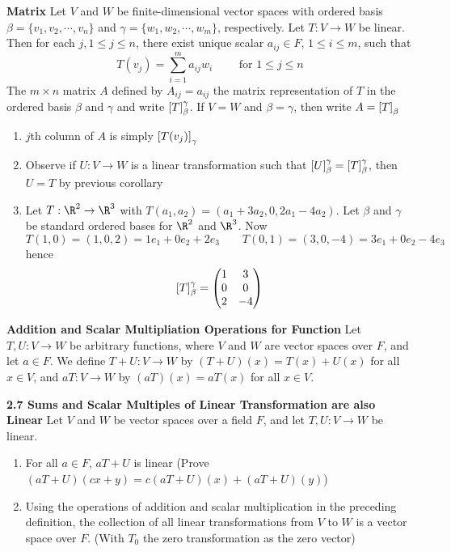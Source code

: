 \documentclass[11pt]{article}
\begin{document}
\begin{defn*}
    \textbf{Matrix} Let $V$ and $W$ be finite-dimensional vector spaces with ordered basis $\beta = \{v_1,v_2,\cdots, v_n\}$ and $\gamma = \{w_1,w_2,\cdots, w_m\}$, respectively. Let $T:V\to W$ be linear. Then for each $j, 1\leq j \leq n$, there exist unique scalar $a_{ij} \in F$, $1\leq i \leq m$, such that 
    \[
        T(v_j) = \sum_{i=1}^m a_{ij}w_i 
        \quad \quad 
        \text{ for } 1\leq j \leq n    
    \]
    The $m\times n$ matrix $A$ defined by $A_{ij}=a_{ij}$ the matrix representation of $T$ in the ordered basis $\beta$ and $\gamma$ and write $\left[ T \right]_{\beta}^{\gamma}$. If $V=W$ and $\beta=\gamma$, then write $A = \left[ T \right]_{\beta}$
    \begin{enumerate}
        \item $j$th column of $A$ is simply $\left[ T(v_j) \right]_{\gamma}$
        \item Observe if $U:V\to W$ is a linear transformation such that $\left[ U \right]_{\beta}^{\gamma}=  \left[ T \right]_{\beta}^{\gamma}$, then $U=T$ by previous corollary 
        \item Let $T:\R^2\to \R^3$ with $T(a_1,a_2) = (a_1+3a_2, 0, 2a_1-4a_2)$. Let $\beta$ and $\gamma$ be standard ordered bases for $\R^2$ and $\R^3$. Now 
        \[
            T(1,0)=(1,0,2)=1e_1 + 0e_2 + 2e_3 \quad \quad 
            T(0,1)=(3,0,-4)=3e_1+0e_2-4e_3    
        \]
        hence 
        \[            
            \left[ T \right]_{\beta}^{\gamma} = 
            \begin{pmatrix}
                1 & 3 \\
                0 & 0 \\
                2 & -4 \\ 
            \end{pmatrix}
        \]
    \end{enumerate}
\end{defn*}


\begin{defn*}
    \textbf{Addition and Scalar Multipliation Operations for Function} Let $T,U:V\to W$ be arbitrary functions, where $V$ and $W$ are vector spaces over $F$, and let $a\in F$. We define $T+U:V\to W$ by $(T+U)(x) = T(x)+U(x)$ for all $x\in V$, and $aT:V\to W$ by $(aT)(x) = aT(x)$ for all $x\in V$. 
\end{defn*}

\begin{theorem*}
    \textbf{2.7 Sums and Scalar Multiples of Linear Transformation are also Linear} 
    Let $V$ and $W$ be vector spaces over a field $F$, and let $T,U:V\to W$ be linear. 
    \begin{enumerate}
        \item For all $a\in F$, $aT+U$ is linear (Prove $(aT+U)(cx+y) = c(aT+U)(x)+(aT+U)(y)$)
        \item Using the operations of addition and scalar multiplication in the preceding definition, the collection of all linear transformations from $V$ to $W$ is a vector space over $F$. (With $T_0$ the zero transformation as the zero vector)
    \end{enumerate}
\end{theorem*}
\end{document}
